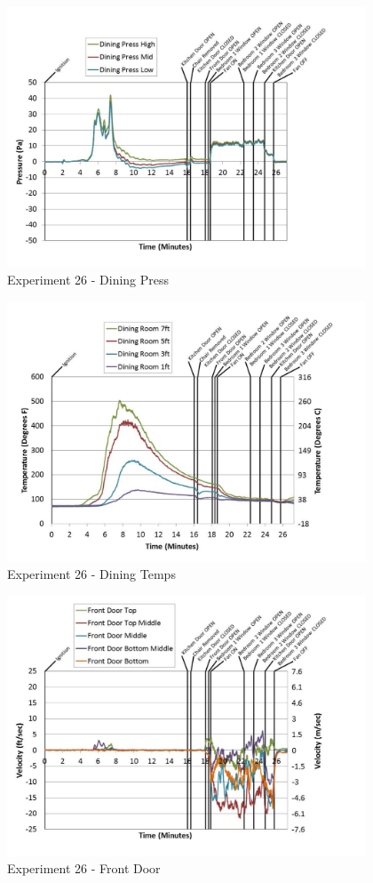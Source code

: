 \documentclass{article}
\begin{document}
\begin{appendices}
	\clearpage

	\begin{figure}[h!]
		\centering
		\includegraphics[height=3.05in]{0_Images/Results_Charts/Exp_26_Charts/DiningPress.pdf}
		\caption{Experiment 26 - Dining Press}
	\end{figure}
 

	\begin{figure}[h!]
		\centering
		\includegraphics[height=3.05in]{0_Images/Results_Charts/Exp_26_Charts/DiningTemps.pdf}
		\caption{Experiment 26 - Dining Temps}
	\end{figure}
 
	\clearpage

	\begin{figure}[h!]
		\centering
		\includegraphics[height=3.05in]{0_Images/Results_Charts/Exp_26_Charts/FrontDoor.pdf}
		\caption{Experiment 26 - Front Door}
	\end{figure}
 


\end{appendices}
\end{document}
